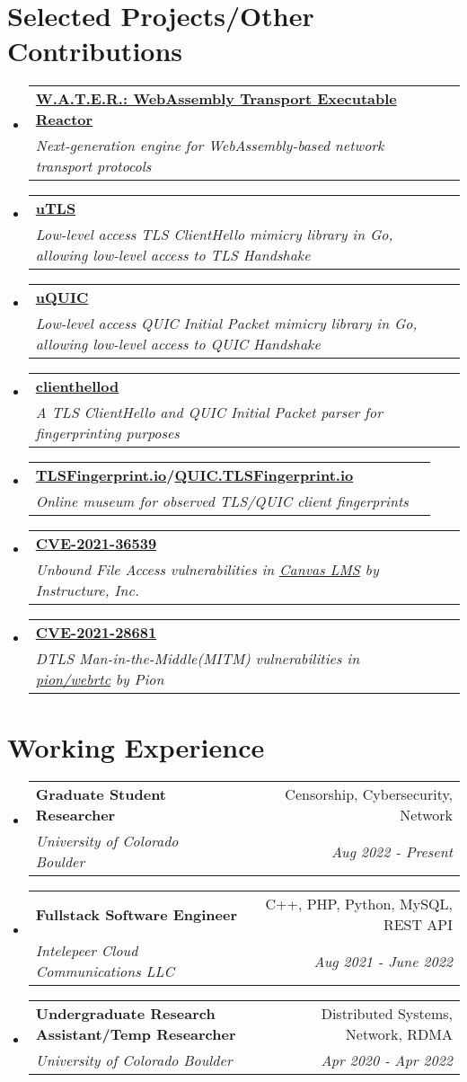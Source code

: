 \documentclass[letterpaper,11pt]{article}
\makeatletter
\newcommand{\resumeSubheading}[4]{
  \vspace{-2pt}\item
    \begin{tabular*}{0.97\textwidth}[t]{l@{\extracolsep{\fill}}r}
      \textbf{#1} & #2 \\
      \textit{\small#3} & \textit{\small #4} \\
    \end{tabular*}\vspace{-7pt}
}
\newcommand{\resumeSubHeadingListStart}{\begin{itemize}[leftmargin=0.15in, label={}]}
\newcommand{\resumeSubHeadingListEnd}{\end{itemize}}
\makeatother
\begin{document}
\section{Selected Projects/Other Contributions}
\resumeSubHeadingListStart
\resumeSubheading
{\href{https://github.com/gaukas/water}{\textbf{W.A.T.E.R.: WebAssembly Transport Executable Reactor}}}{}
{Next-generation engine for WebAssembly-based network transport protocols}{}
\resumeSubheading
{\href{https://github.com/refraction-networking/utls}{\textbf{uTLS}}}{}
{Low-level access TLS ClientHello mimicry library in Go, allowing low-level access to TLS Handshake}{}
\resumeSubheading
{\href{https://github.com/refraction-networking/uquic}{\textbf{uQUIC}}}{}
{Low-level access QUIC Initial Packet mimicry library in Go, allowing low-level access to QUIC Handshake}{}
\resumeSubheading
{\href{https://github.com/gaukas/clienthellod}{\textbf{clienthellod}}}{}
{A TLS ClientHello and QUIC Initial Packet parser for fingerprinting purposes}{}
\resumeSubheading
{\href{https://tlsfingerprint.io}{\textbf{TLSFingerprint.io}}/\href{https://quic.tlsfingerprint.io}{\textbf{QUIC.TLSFingerprint.io}}}{}
{Online museum for observed TLS/QUIC client fingerprints}{}
\resumeSubheading
{\href{https://cve.mitre.org/cgi-bin/cvename.cgi?name=CVE-2021-36539}{\textbf{CVE-2021-36539}}}{}
{Unbound File Access vulnerabilities in \href{https://www.instructure.com/canvas}{Canvas LMS} by \emph{Instructure, Inc.}}{}
\resumeSubheading
{\href{https://cve.mitre.org/cgi-bin/cvename.cgi?name=CVE-2021-28681}{\textbf{CVE-2021-28681}}}{}
{DTLS Man-in-the-Middle(MITM) vulnerabilities in \href{https://github.com/pion/webrtc}{pion/webrtc} by \emph{Pion}}{}
\resumeSubHeadingListEnd
\vspace{1pt}

\section{Working Experience}
\resumeSubHeadingListStart
\resumeSubheading
{Graduate Student Researcher}{Censorship, Cybersecurity, Network}
{University of Colorado Boulder}{Aug 2022 - Present}
\resumeSubheading
{Fullstack Software Engineer}{C++, PHP, Python, MySQL, REST API}
{Intelepeer Cloud Communications LLC}{Aug 2021 - June 2022}
\resumeSubheading
{Undergraduate Research Assistant/Temp Researcher}{Distributed Systems, Network, RDMA}
{University of Colorado Boulder}{Apr 2020 - Apr 2022}
\resumeSubHeadingListEnd
\vspace{1pt}
\end{document}
